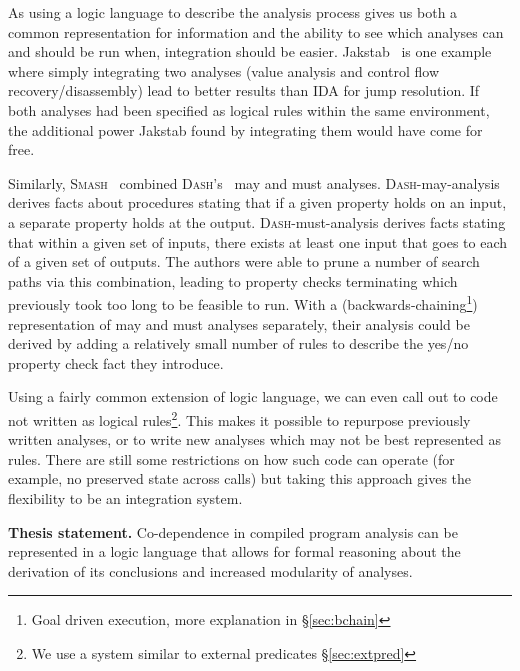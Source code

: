 As using a logic language to describe the analysis process gives us both a common representation for information and the ability to see which analyses can and should be run when, integration should be easier.
Jakstab~\cite{jakstab} is one example where simply integrating two analyses (value analysis and control flow recovery/disassembly) lead to better results than IDA\cite{ida} for jump resolution.
If both analyses had been specified as logical rules within the same environment, the additional power Jakstab found by integrating them would have come for free.

Similarly, \textsc{Smash}~\cite{smash} combined \textsc{Dash}'s~\cite{dash} may and must analyses.
\textsc{Dash}-may-analysis derives facts about procedures stating that if a given property holds on an input, a separate property holds at the output.
\textsc{Dash}-must-analysis derives facts stating that within a given set of inputs, there exists at least one input that goes to each of a given set of outputs.
The authors were able to prune a number of search paths via this combination, leading to property checks terminating which previously took too long to be feasible to run.
With a (backwards-chaining\footnote{Goal driven execution, more explanation in \S\ref{sec:bchain}}) representation of may and must analyses separately, their analysis could be derived by adding a relatively small number of rules to describe the yes/no property check fact they introduce.

Using a fairly common extension of logic language, we can even call out to code not written as logical rules\footnote{We use a system similar to external predicates \S\ref{sec:extpred}}.
This makes it possible to repurpose previously written analyses, or to write new analyses which may not be best represented as rules.
There are still some restrictions on how such code can operate (for example, no preserved state across calls) but taking this approach gives the flexibility to be an integration system.

\begin{inset}
{\bf Thesis statement.}
Co-dependence in compiled program analysis can be represented in a logic language that allows for formal reasoning about the derivation of its conclusions and increased modularity of analyses.
\end{inset}

